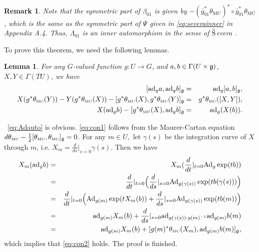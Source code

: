 \documentclass[letterpaper,10pt, oneside]{article} %
\newtheorem{lem}[thm]{Lemma}\newtheorem{lemma}[thm]{Lemma}
\newtheorem{rmk}[thm]{Remark}
\newcommand{\pf}{\noindent{\bf Proof.}\ }
\newcommand{\TM}{\theta_{\scriptscriptstyle \mathrm{MC}}}
\def\qed{\hfill ~\vrule height6pt width6pt depth0pt}
\newcommand{\half}{\frac{1}{2}}
\newcommand{\Ad}{\mathrm{Ad}}
\newcommand{\ad}{\mathrm{ad}}
\begin{document}
\begin{rmk}
Note that the symmetric part of $\beta_{\scriptscriptstyle 01} $ is given by $-(\bar{g}_{\scriptscriptstyle 01}^*\TM)^\star \circ \bar{g}_{\scriptscriptstyle 01}^*\TM$, which is the same as the symmetric part of $\Psi$ given in \eqref{eq:severainner} in Appendix A.4. Thus, $\Lambda_{\scriptscriptstyle 01}$ is an inner automorphism in the sense of  ${\rm\check{S}}$evera \cite{sevlet}.
\end{rmk}

To prove this theorem, we need the following lemmas.
\begin{lem}For any $G$-valued function $g:U\longrightarrow G$, and $a,b\in\Gamma(U\times\mathfrak g)$, $X,Y\in \Gamma(TU)$, we have
  \begin{eqnarray}
 \label{eq:Adauto} [\ad_{g}a,\ad_{g}b]_\g&=&\ad_{g}[a,b]_\g,\\
\label{eq:con1} X( g^*\TM(Y))-Y( g^*\TM(X))-[ g^*\TM(X), g^*\TM(Y)]_\g&=&g^*\TM([X,Y]),\\
 \label{eq:con2}X(\ad_{g}b )-
 [ g^*\TM(X),\ad_{g}b ]_\g&=&\ad_{g}(X(b)).
\end{eqnarray}
\end{lem}
\pf \eqref{eq:Adauto} is obvious. \eqref{eq:con1} follows from the Maurer-Cartan equation $d\TM-\half[\TM,\TM]_\g=0$.  For any $m\in U,$ let $\gamma(s) $ be the integration curve of $X$ through $m$, i.e. $X_m=\frac{d}{ds}|_{s=0}\gamma(s)$.  Then we have
\begin{eqnarray*}
  X_m(\ad_gb)&=&X_m(\frac{d}{dt}|_{t=0}\Ad_g\exp (tb) )\\
  &=&\frac{d}{dt}|_{t=0}\Big(\frac{d}{ds}|_{s=0}\Ad_{g(\gamma(s))}\exp(tb(\gamma(s))) \Big)\\
 &=&\frac{d}{dt}|_{t=0}\Big( \Ad_{g(m)}\exp(tX_m(b)) +\frac{d}{ds}|_{s=0}\Ad_{g(\gamma(s))}\exp(tb(m))\Big)\\
 &=&\ad_{g(m)} X_m(b)+\frac{d}{ds}|_{s=0}\ad_{g(\gamma(s))\cdot g(m)^{-1}}\ad_{g(m)}b(m)\\
  &=&\ad_{g(m)} X_m(b)+[g(m)^*\TM(X_m),\ad_{g(m)}b(m)]_\g,
\end{eqnarray*}
which implies that \eqref{eq:con2} holds. The proof is finished. \qed
\end{document}
